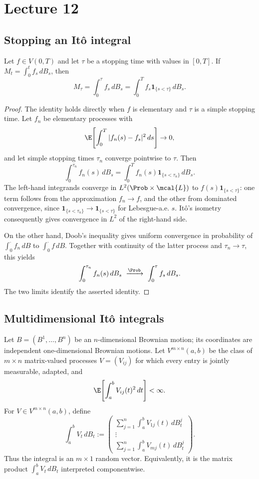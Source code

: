 \section{Lecture 12}
\subsection*{Stopping an It\^o integral}
\begin{lemma}
Let $f\in V(0,T)$ and let $\tau$ be a stopping time with values in $[0,T]$.
If $M_t=\int_0^t f_s\,dB_s$, then
\[
 M_\tau=\int_0^\tau f_s\,dB_s
 =\int_0^T f_s\mathbf{1}_{\{s<\tau\}}\,dB_s.
\]
\end{lemma}
\begin{proof}
The identity holds directly when $f$ is elementary and $\tau$ is a simple
stopping time. Let $f_n$ be elementary processes with
\[
 \E\!\left[\int_0^T|f_n(s)-f_s|^2\,ds\right]\to0,
\]
and let simple stopping times $\tau_n$ converge pointwise to $\tau$. Then
\[
 \int_0^{\tau_n}f_n(s)\,dB_s
 =\int_0^T f_n(s)\mathbf{1}_{\{s<\tau_n\}}\,dB_s.
\]
The left-hand integrands converge in $L^2(\Prob\times\mcal{L})$ to
$f(s)\mathbf{1}_{\{s<\tau\}}$: one term follows from the approximation
$f_n\to f$, and the other from dominated convergence, since
$\mathbf{1}_{\{s<\tau_n\}}\to\mathbf{1}_{\{s<\tau\}}$ for Lebesgue-a.e.
$s$. It\^o's isometry consequently gives convergence in $L^2$ of the
right-hand side.

On the other hand, Doob's inequality gives uniform convergence in probability
of $\int_0^\cdot f_n\,dB$ to $\int_0^\cdot f\,dB$. Together with continuity
of the latter process and $\tau_n\to\tau$, this yields
\[
 \int_0^{\tau_n} f_n(s)\,dB_s\ \xrightarrow{\Prob}\ \int_0^\tau f_s\,dB_s.
\]
The two limits identify the asserted identity.
\end{proof}

\subsection*{Multidimensional It\^o integrals}
Let $B=(B^1,\ldots,B^n)$ be an $n$-dimensional Brownian motion; its
coordinates are independent one-dimensional Brownian motions. Let
$V^{m\times n}(a,b)$ be the class of $m\times n$ matrix-valued processes
$V=(V_{ij})$ for which every entry is jointly measurable, adapted, and
\[
 \E\!\left[\int_a^b V_{ij}(t)^2\,dt\right]<\infty.
\]
For $V\in V^{m\times n}(a,b)$, define
\[
 \int_a^bV_t\,dB_t
 :=\begin{pmatrix}
 \sum_{j=1}^n\int_a^bV_{1j}(t)\,dB_t^j\\
 \vdots\\
 \sum_{j=1}^n\int_a^bV_{mj}(t)\,dB_t^j
 \end{pmatrix}.
\]
Thus the integral is an $m\times1$ random vector. Equivalently, it is the
matrix product $\int_a^b V_t\,dB_t$ interpreted componentwise.

